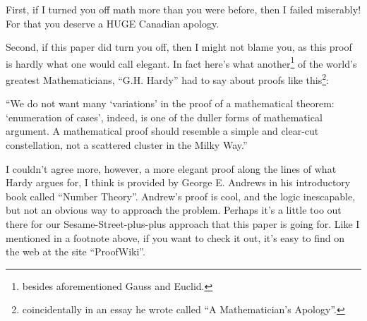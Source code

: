 \documentclass{article}
\newenvironment{jprIn}{\begin{adjustwidth}{2em}{}}{\end{adjustwidth}}
\begin{document}
First, if I turned you off math more than you were before,
then I failed miserably!  For that you deserve a HUGE Canadian apology.

Second, if this paper did turn you off,
then I might not blame you, as this proof is hardly what one would call elegant.
In fact here's what another\footnote{besides aforementioned Gauss and Euclid.}
of the
world's greatest Mathematicians, ``G.H. Hardy'' had to say about
proofs like this\footnote{coincidentally in an essay he wrote called ``A Mathematician's Apology''.}:

\begin{jprIn}
``We do not want many `variations' in the proof of a mathematical
theorem: `enumeration of cases', indeed, is one
of the duller forms of mathematical argument. A mathematical proof
should resemble a simple and clear-cut constellation, not a scattered
cluster in the Milky Way.''
\end{jprIn}

I couldn't agree more, however, a more elegant proof along the lines
of what Hardy argues for, I think is provided by George E. Andrews in his
introductory book called ``Number Theory''. Andrew's proof is cool,
and the logic inescapable, but not an obvious way to approach the problem.
Perhaps it's a little too out there for our Sesame-Street-plus-plus
approach that this paper is going for. Like I mentioned in a footnote above,
if you want to check it out, it's easy to find on the web at the site ``ProofWiki''.
\end{document}
